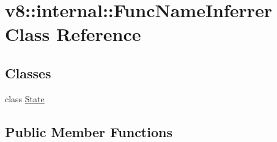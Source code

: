 \hypertarget{classv8_1_1internal_1_1FuncNameInferrer}{}\section{v8\+:\+:internal\+:\+:Func\+Name\+Inferrer Class Reference}
\label{classv8_1_1internal_1_1FuncNameInferrer}
\subsection*{Classes}
\begin{DoxyCompactItemize}
\item 
class \mbox{\hyperlink{classv8_1_1internal_1_1FuncNameInferrer_1_1State}{State}}
\end{DoxyCompactItemize}
\subsection*{Public Member Functions}
